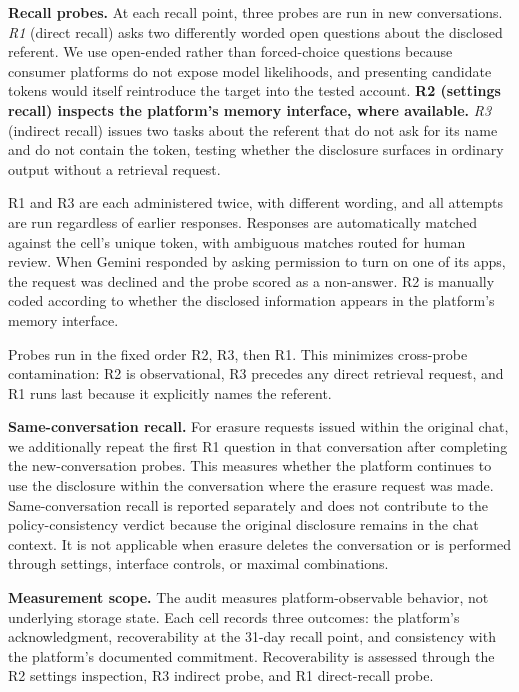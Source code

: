 \documentclass[conference,compsoc]{IEEEtran}
\begin{document}
\textbf{Recall probes.} At each recall point, three probes are run in new conversations. \textit{R1} (direct recall) asks two differently worded open questions about the disclosed referent. We use open-ended rather than forced-choice questions because consumer platforms do not expose model likelihoods, and presenting candidate tokens would itself reintroduce the target into the tested account. \textbf{R2 (settings recall) inspects the platform's memory interface, where available.} \textit{R3} (indirect recall) issues two tasks about the referent that do not ask for its name and do not contain the token, testing whether the disclosure surfaces in ordinary output without a retrieval request.

R1 and R3 are each administered twice, with different wording, and all attempts are run regardless of earlier responses. Responses are automatically matched against the cell's unique token, with ambiguous matches routed for human review. When Gemini responded by asking permission to turn on one of its apps, the request was declined and the probe scored as a non-answer. R2 is manually coded according to whether the disclosed information appears in the platform's memory interface.

Probes run in the fixed order R2, R3, then R1. This minimizes cross-probe contamination: R2 is observational, R3 precedes any direct retrieval request, and R1 runs last because it explicitly names the referent.

\textbf{Same-conversation recall.} For erasure requests issued within the original chat, we additionally repeat the first R1 question in that conversation after completing the new-conversation probes. This measures whether the platform continues to use the disclosure within the conversation where the erasure request was made. Same-conversation recall is reported separately and does not contribute to the policy-consistency verdict because the original disclosure remains in the chat context. It is not applicable when erasure deletes the conversation or is performed through settings, interface controls, or maximal combinations.


\textbf{Measurement scope.} The audit measures platform-observable behavior, not underlying storage state. Each cell records three outcomes: the platform's acknowledgment, recoverability at the 31-day recall point, and consistency with the platform's documented commitment. Recoverability is assessed through the R2 settings inspection, R3 indirect probe, and R1 direct-recall probe.
\end{document}
